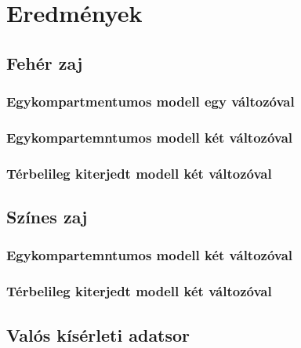 \section{Eredmények}

\subsection{Fehér zaj}

\subsubsection{Egykompartmentumos modell egy változóval}

\subsubsection{Egykompartemntumos modell két változóval}

\subsubsection{Térbelileg kiterjedt modell két változóval}



\subsection{Színes zaj}

\subsubsection{Egykompartemntumos modell két változóval}

\subsubsection{Térbelileg kiterjedt modell két változóval}

\subsection{Valós kísérleti adatsor}
